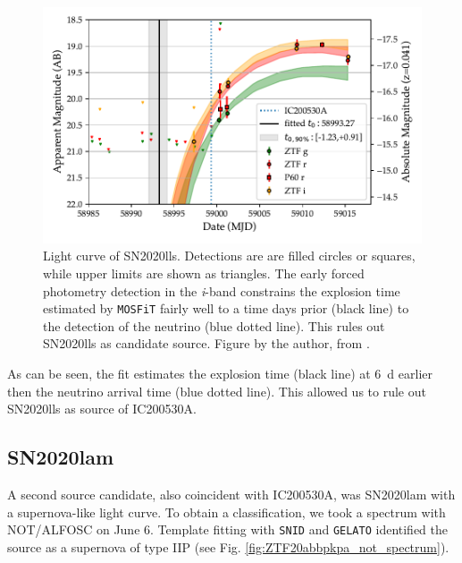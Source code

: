 \documentclass[
    a4paper, %
    fontsize=10pt, %
    twoside=true, %
    numbers=noenddot, %
    fontmethod=tex,
]{kaobook}
\begin{document}
\begin{figure}[h!]
    \includegraphics[width=1\textwidth]{fu/ZTF20abdnpdo_mosfit.pdf}
    \caption[SN2020lls light curve fit]{Light curve of SN2020lls. Detections are are filled circles or squares, while upper limits are shown as triangles. The early forced photometry detection in the \textit{i}-band constrains the explosion time estimated by \texttt{MOSFiT} fairly well to a time days prior (black line) to the detection of the neutrino (blue dotted line). This rules out SN2020lls as candidate source. Figure by the author, from \cite{Stein2023a}.}
\end{figure}
As can be seen, the fit estimates the explosion time (black line) at \SI{6}{\day} earlier then the neutrino arrival time (blue dotted line). This allowed us to rule out SN2020lls as source of IC200530A.

\subsection{SN2020lam}
A second source candidate, also coincident with IC200530A, was SN2020lam  with a supernova-like light curve. To obtain a classification, we took a spectrum with NOT/ALFOSC on June 6. Template fitting with \texttt{SNID} and \texttt{GELATO}  identified the source as a supernova of type IIP (see Fig. \ref{fig:ZTF20abbpkpa_not_spectrum}).
\end{document}
